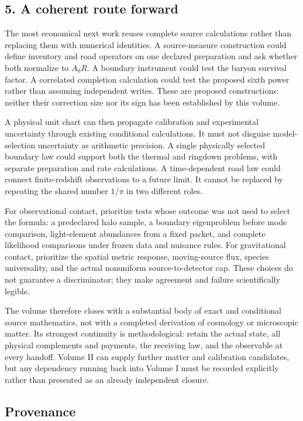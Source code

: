 \subsection*{5. A coherent route forward}

The most economical next work reuses complete source calculations rather than replacing them with numerical identities. A source-measure construction could define inventory and road operators on one declared preparation and ask whether both normalize to $A_0R$. A boundary instrument could test the baryon survival factor. A correlated completion calculation could test the proposed sixth power rather than assuming independent writes. These are proposed constructions: neither their correction size nor its sign has been established by this volume.

A physical unit chart can then propagate calibration and experimental uncertainty through existing conditional calculations. It must not disguise model-selection uncertainty as arithmetic precision. A single physically selected boundary law could support both the thermal and ringdown problems, with separate preparation and rate calculations. A time-dependent road law could connect finite-redshift observations to a future limit. It cannot be replaced by repeating the shared number $1/\pi$ in two different roles.

For observational contact, prioritize tests whose outcome was not used to select the formula: a predeclared halo sample, a boundary eigenproblem before mode comparison, light-element abundances from a fixed packet, and complete likelihood comparisons under frozen data and nuisance rules. For gravitational contact, prioritize the spatial metric response, moving-source flux, species universality, and the actual nonuniform source-to-detector cap. These choices do not guarantee a discriminator; they make agreement and failure scientifically legible.

The volume therefore closes with a substantial body of exact and conditional source mathematics, not with a completed derivation of cosmology or microscopic matter. Its strongest continuity is methodological: retain the actual state, all physical complements and payments, the receiving law, and the observable at every handoff. Volume II can supply further matter and calibration candidates, but any dependency running back into Volume I must be recorded explicitly rather than presented as an already independent closure.

\subsection*{Provenance}

